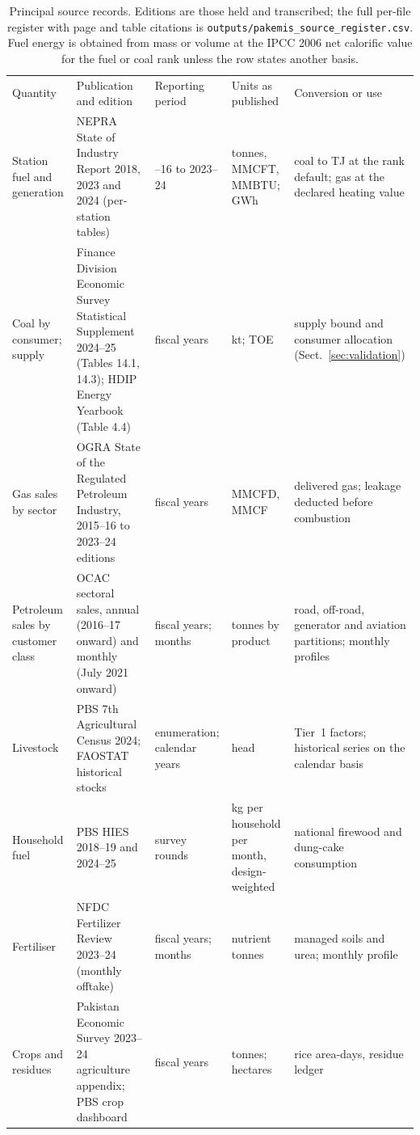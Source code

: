 \documentclass[essd,manuscript]{copernicus}
\begin{document}
\begin{table}[t]
\caption{Principal source records. Editions are those held and transcribed; the full per-file register with page and table citations is \texttt{outputs/pakemis\_source\_register.csv}. Fuel energy is obtained from mass or volume at the IPCC 2006 net calorific value for the fuel or coal rank unless the row states another basis.}
\label{tab:sources}
\footnotesize
\begin{tabular}{@{}>{\raggedright\arraybackslash}p{3.1cm}>{\raggedright\arraybackslash}p{4.3cm}>{\raggedright\arraybackslash}p{2.6cm}>{\raggedright\arraybackslash}p{2.6cm}>{\raggedright\arraybackslash}p{3.6cm}@{}}
\tophline
Quantity & Publication and edition & Reporting period & Units as published & Conversion or use \\
\middlehline
Station fuel and generation & NEPRA State of Industry Report 2018, 2023 and 2024 (per-station tables) & 2015--16 to 2023--24 & tonnes, MMCFT, MMBTU; GWh & coal to TJ at the rank default; gas at the declared heating value \\
Coal by consumer; supply & Finance Division Economic Survey Statistical Supplement 2024--25 (Tables 14.1, 14.3); HDIP Energy Yearbook (Table 4.4) & fiscal years & kt; TOE & supply bound and consumer allocation (Sect.~\ref{sec:validation}) \\
Gas sales by sector & OGRA State of the Regulated Petroleum Industry, 2015--16 to 2023--24 editions & fiscal years & MMCFD, MMCF & delivered gas; leakage deducted before combustion \\
Petroleum sales by customer class & OCAC sectoral sales, annual (2016--17 onward) and monthly (July 2021 onward) & fiscal years; months & tonnes by product & road, off-road, generator and aviation partitions; monthly profiles \\
Livestock & PBS 7th Agricultural Census 2024; FAOSTAT historical stocks & 2024 enumeration; calendar years & head & Tier~1 factors; historical series on the calendar basis \\
Household fuel & PBS HIES 2018--19 and 2024--25 & survey rounds & kg per household per month, design-weighted & national firewood and dung-cake consumption \\
Fertiliser & NFDC Fertilizer Review 2023--24 (monthly offtake) & fiscal years; months & nutrient tonnes & managed soils and urea; monthly profile \\
Crops and residues & Pakistan Economic Survey 2023--24 agriculture appendix; PBS crop dashboard & fiscal years & tonnes; hectares & rice area-days, residue ledger \\

\end{tabular}
\end{table}
\end{document}
